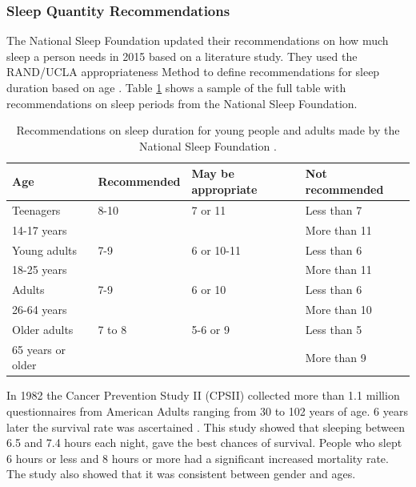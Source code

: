 \documentclass[12pt]{article} %
\begin{document}
\subsubsection{Sleep Quantity Recommendations}
The National Sleep Foundation updated their recommendations on how much sleep a person needs in 2015 based on a literature study. They used the RAND/UCLA appropriateness Method to define recommendations for sleep duration based on age \cite{duration}. Table \ref{tab:recommendation} shows a sample of the full table with recommendations on sleep periods from the National Sleep Foundation. 

\begin{table}[H]
\center
\begin{footnotesize}
	\begin{tabular}{|p{2.5cm} |p{3.3cm} |p{3.5cm} |p{3.5cm} |}
	\hline
	\textbf{Age} & \textbf{Recommended} & \textbf{May be appropriate} & \textbf{Not recommended} \\
	\hline
Teenagers & 8-10 & 7 or 11 & Less than 7\\
14-17 years & & & More than 11\\
	\hline
Young adults & 7-9 & 6 or 10-11 & Less than 6\\
18-25 years & & & More than 11\\
	\hline
Adults & 7-9 & 6 or 10 & Less than 6\\
26-64 years & & & More than 10\\
	\hline
Older adults & 7 to 8 & 5-6 or 9 & Less than 5\\
65 years or older & & & More than 9\\
	\hline
	\end{tabular}
	\caption{Recommendations on sleep duration for young people and adults made by the National Sleep Foundation \cite{duration}.}
	\label{tab:recommendation}
\end{footnotesize}
\end{table}

In 1982 the Cancer Prevention Study II (CPSII) collected more than 1.1 million questionnaires from American Adults ranging from 30 to 102 years of age. 6 years later the survival rate was ascertained \cite{arch}. This study showed that sleeping between 6.5 and 7.4 hours each night, gave the best chances of survival. People who slept 6 hours or less and 8 hours or more had a significant increased mortality rate. The study also showed that it was consistent between gender and ages. \\
\end{document}

